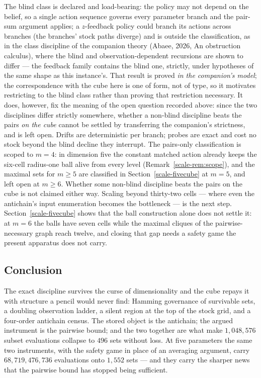 \documentclass[10pt,twocolumn]{article}
\theoremstyle{plain}
\theoremstyle{definition}
\theoremstyle{remark}
\begin{document}
The blind class is declared and load-bearing: the policy may not
depend on the belief, so a single action sequence governs every
parameter branch and the pair-sum argument applies; a
\(z\)-feedback policy could branch its actions across branches (the
branches' stock paths diverge) and is outside the classification, as in the class discipline of the companion theory
(Abaee, 2026, An obstruction calculus), where the blind and
observation-dependent recursions are shown to differ --- the
feedback family contains the blind one, strictly, under
hypotheses of the same shape as this instance's. That result is
proved \emph{in the companion's model}; the correspondence with
the cube here is one of form, not of type, so it motivates
restricting to the blind class rather than proving that
restriction necessary. It does, however, fix the meaning of the
open question recorded above: since the two disciplines differ
strictly somewhere, whether a non-blind discipline beats the
pairs \emph{on the cube} cannot be settled by transferring the
companion's strictness, and is left open. Drifts are
deterministic per branch; probes are exact and cost no stock beyond
the blind decline they interrupt. The pairs-only classification is scoped to
\(m = 4\): in dimension five the constant matched action already
keeps the six-cell radius-one ball alive from every level
(Remark~\ref{scale-rem:scope}), and the maximal sets for \(m \ge 5\) are classified in Section~\ref{scale-fivecube} at \(m = 5\), and left open at \(m \ge 6\). Whether some non-blind discipline
beats the pairs on the cube is not claimed either way. Scaling beyond thirty-two cells --- where even the antichain's input enumeration becomes the bottleneck --- is the next step. Section~\ref{scale-fivecube} shows that the ball construction alone does not settle it: at \(m = 6\) the balls have seven cells while the maximal cliques of the pairwise-necessary graph reach twelve, and closing that gap needs a safety game the present apparatus does not carry.

\subsection{Conclusion}\label{scale-conclusion}

The exact discipline survives the curse of dimensionality and the
cube repays it with structure a pencil would never find: Hamming
governance of survivable sets, a doubling observation ladder, a
silent region at the top of the stock grid, and a four-order
antichain census. The stored object is the antichain; the argued instrument is the pairwise bound; and the two together are what make \(1{,}048{,}576\) subset evaluations collapse to \(496\) sets without loss. At five parameters the same two instruments, with the safety game in place of an averaging argument, carry \(68{,}719{,}476{,}736\) evaluations onto \(1{,}552\) sets --- and they carry the sharper news that the pairwise bound has stopped being sufficient.
\end{document}
